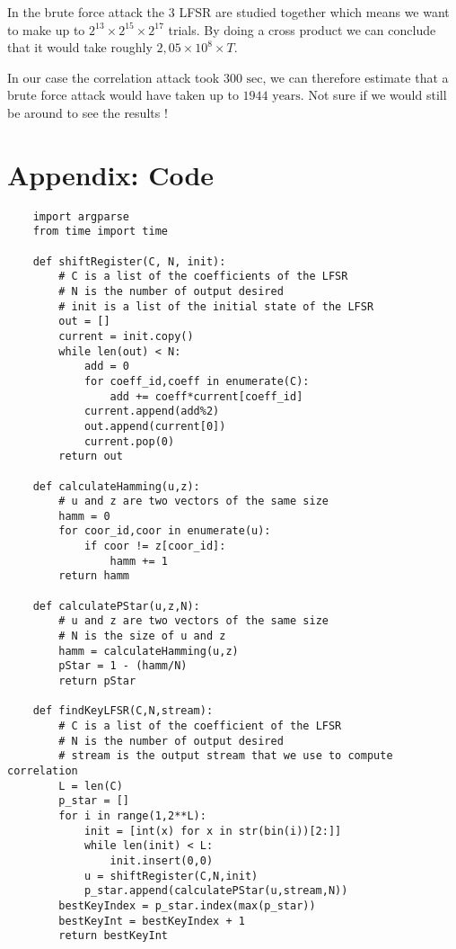 \documentclass{article}
\begin{document}
In the brute force attack the $3$ LFSR are studied together which means we want to make up to $2^{13} \times 2^{15}\times 2^{17}$ trials. By doing a cross product we can conclude that it would take roughly $2,05 \times 10^8 \times T$.\newline

In our case the correlation attack took $300 \text{ sec}$, we can therefore estimate that a brute force attack would have taken up to $1944 \text{ years}$. Not sure if we would still be around to see the results !

\newpage

\section{Appendix: Code}

\begin{verbatim}
    import argparse
    from time import time
    
    def shiftRegister(C, N, init):
        # C is a list of the coefficients of the LFSR
        # N is the number of output desired
        # init is a list of the initial state of the LFSR
        out = []
        current = init.copy()
        while len(out) < N:
            add = 0
            for coeff_id,coeff in enumerate(C):
                add += coeff*current[coeff_id]
            current.append(add%2)
            out.append(current[0])
            current.pop(0)
        return out
    
    def calculateHamming(u,z):
        # u and z are two vectors of the same size
        hamm = 0
        for coor_id,coor in enumerate(u):
            if coor != z[coor_id]:
                hamm += 1
        return hamm
    
    def calculatePStar(u,z,N):
        # u and z are two vectors of the same size
        # N is the size of u and z
        hamm = calculateHamming(u,z)
        pStar = 1 - (hamm/N)
        return pStar
    
    def findKeyLFSR(C,N,stream):
        # C is a list of the coefficient of the LFSR
        # N is the number of output desired
        # stream is the output stream that we use to compute correlation
        L = len(C)
        p_star = []
        for i in range(1,2**L):
            init = [int(x) for x in str(bin(i))[2:]]
            while len(init) < L:
                init.insert(0,0)
            u = shiftRegister(C,N,init)
            p_star.append(calculatePStar(u,stream,N))
        bestKeyIndex = p_star.index(max(p_star))
        bestKeyInt = bestKeyIndex + 1
        return bestKeyInt
    

\end{verbatim}
\end{document}
